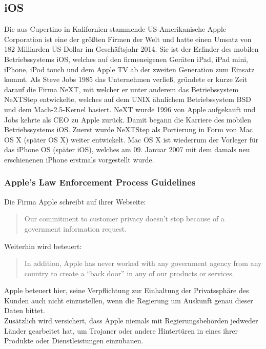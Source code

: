 \subsection{iOS}
	Die aus Cupertino in Kalifornien stammende US-Amerikanische Apple Corporation
	ist eine der größten Firmen der Welt und hatte einen Umsatz von 182 Milliarden
	US-Dollar im Geschäftsjahr 2014. Sie ist der Erfinder des mobilen
	Betriebssystems iOS, welches auf den firmeneigenen Geräten iPad, iPad mini,
	iPhone, iPod touch und dem Apple TV ab der zweiten Generation zum Einsatz
	kommt. Als Steve Jobs 1985 das Unternehmen verließ, gründete er
	kurze Zeit darauf die Firma NeXT, mit welcher er unter anderem das
	Betriebssystem NeXTStep entwickelte, welches auf dem UNIX ähnlichem
	Betriebssystem BSD\cite[S.12]{Tanenbaum2009} und dem Mach-2.5-Kernel
	\cite{MachProject2015} basiert. NeXT wurde 1996 von Apple aufgekauft und Jobs
	kehrte als CEO zu Apple zurück. Damit begann die Karriere des mobilen
	Betriebssystems iOS. Zuerst wurde NeXTStep als Portierung in Form von Mac OS X
	(später OS X) weiter entwickelt. Mac OS X ist wiederrum der Vorleger für das
	iPhone OS (später iOS), welches am 09. Januar 2007 mit dem damals neu
	erschienenen iPhone erstmals vorgestellt wurde.
	
	\subsubsection{Apple's Law Enforcement Process Guidelines}
		Die Firma Apple schreibt auf ihrer Webseite:
		\begin{quote}
			Our commitment to customer privacy doesn't stop because of a government
			information request.\cite{AppleGovInfo2015}
		\end{quote}
		Weiterhin wird beteuert:
		\begin{quote}
			In addition, Apple has never worked with any government agency from any
			country to create a "`back door"' in any of our products or
			services.\cite{AppleGovInfo2015}
		\end{quote}
		Apple beteuert hier, seine Verpflichtung zur Einhaltung der Privatssphäre des
		Kunden auch nicht einzustellen, wenn die Regierung um Auskunft genau dieser
		Daten bittet.\\
		Zusätzlich wird versichert, dass Apple niemals mit Regierungsbehörden
		jedweder Länder gearbeitet hat, um Trojaner oder andere Hintertüren in eines
		ihrer Produkte oder Dienstleistungen einzubauen.
		